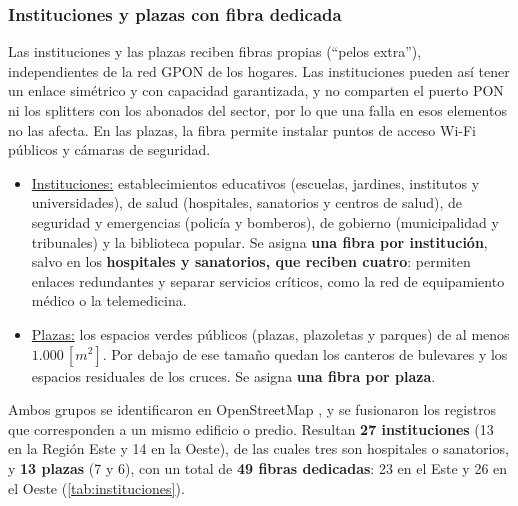 \subsubsection{Instituciones y plazas con fibra dedicada}
\label{sec:instituciones}
Las instituciones y las plazas reciben fibras propias (``pelos extra''), independientes de la red GPON de los hogares. Las instituciones pueden así tener un enlace simétrico y con capacidad garantizada, y no comparten el puerto PON ni los splitters con los abonados del sector, por lo que una falla en esos elementos no las afecta. En las plazas, la fibra permite instalar puntos de acceso Wi-Fi públicos y cámaras de seguridad.
\begin{itemize}
    \item \underline{Instituciones:} establecimientos educativos (escuelas, jardines, institutos y universidades), de salud (hospitales, sanatorios y centros de salud), de seguridad y emergencias (policía y bomberos), de gobierno (municipalidad y tribunales) y la biblioteca popular. Se asigna \textbf{una fibra por institución}, salvo en los \textbf{hospitales y sanatorios, que reciben cuatro}: permiten enlaces redundantes y separar servicios críticos, como la red de equipamiento médico o la telemedicina.
    \item \underline{Plazas:} los espacios verdes públicos (plazas, plazoletas y parques) de al menos $1.000 \, [m^2]$. Por debajo de ese tamaño quedan los canteros de bulevares y los espacios residuales de los cruces. Se asigna \textbf{una fibra por plaza}.
\end{itemize}
Ambos grupos se identificaron en OpenStreetMap \cite{osm}, y se fusionaron los registros que corresponden a un mismo edificio o predio. Resultan \textbf{27 instituciones} (13 en la Región Este y 14 en la Oeste), de las cuales tres son hospitales o sanatorios, y \textbf{13 plazas} (7 y 6), con un total de \textbf{49 fibras dedicadas}: 23 en el Este y 26 en el Oeste (\autoref{tab:instituciones}).

